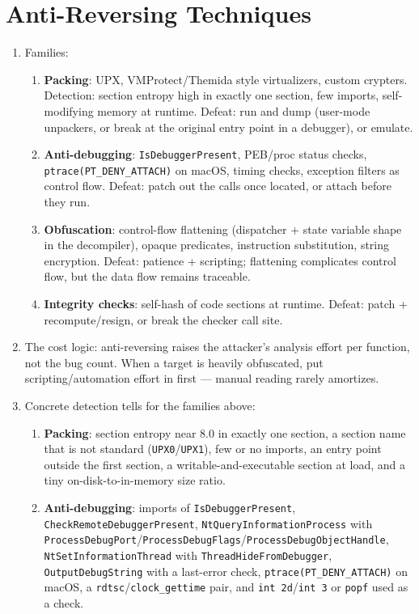 \documentclass[12pt]{Training}
\begin{document}
\section*{Anti-Reversing Techniques}
\begin{enumerate}
    \item Families:
    \begin{enumerate}
        \item \textbf{Packing}: UPX, VMProtect/Themida style virtualizers, custom crypters. Detection: section entropy high in exactly one section, few imports, self-modifying memory at runtime. Defeat: run and dump (user-mode unpackers, or break at the original entry point in a debugger), or emulate.
        \item \textbf{Anti-debugging}: \lstinline{IsDebuggerPresent}, PEB/proc status checks, \lstinline{ptrace(PT_DENY_ATTACH)} on macOS, timing checks, exception filters as control flow. Defeat: patch out the calls once located, or attach before they run.
        \item \textbf{Obfuscation}: control-flow flattening (dispatcher + state variable shape in the decompiler), opaque predicates, instruction substitution, string encryption. Defeat: patience + scripting; flattening complicates control flow, but the data flow remains traceable.
        \item \textbf{Integrity checks}: self-hash of code sections at runtime. Defeat: patch + recompute/resign, or break the checker call site.
    \end{enumerate}
    \item The cost logic: anti-reversing raises the attacker's analysis effort per function, not the bug count. When a target is heavily obfuscated, put scripting/automation effort in first --- manual reading rarely amortizes.
    \item Concrete detection tells for the families above:
    \begin{enumerate}
        \item \textbf{Packing}: section entropy near 8.0 in exactly one section, a section name that is not standard (\lstinline{UPX0}/\lstinline{UPX1}), few or no imports, an entry point outside the first section, a writable-and-executable section at load, and a tiny on-disk-to-in-memory size ratio.
        \item \textbf{Anti-debugging}: imports of \lstinline{IsDebuggerPresent}, \lstinline{CheckRemoteDebuggerPresent}, \lstinline{NtQueryInformationProcess} with \lstinline{ProcessDebugPort}/\lstinline{ProcessDebugFlags}/\lstinline{ProcessDebugObjectHandle}, \lstinline{NtSetInformationThread} with \lstinline{ThreadHideFromDebugger}, \lstinline{OutputDebugString} with a last-error check, \lstinline{ptrace(PT_DENY_ATTACH)} on macOS, a \lstinline{rdtsc}/\lstinline{clock_gettime} pair, and \lstinline{int 2d}/\lstinline{int 3} or \lstinline{popf} used as a check.

\end{enumerate}
\end{enumerate}
\end{document}
